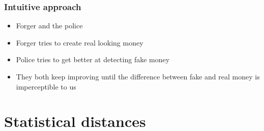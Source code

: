 \documentclass{Bredelebeamer}
\begin{document}
\begin{frame}
	\frametitle{Intuitive approach}
	\begin{itemize}
		\item Forger and the police
		\item Forger tries to create real looking money
		\item Police tries to get better at detecting fake money
		\item They both keep improving until the difference between fake and real money is imperceptible to us
	\end{itemize}
\end{frame}

\section{Statistical distances}
\end{document}
